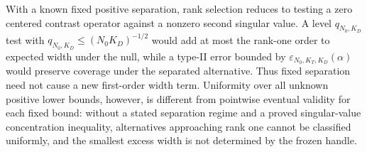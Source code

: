 With a known fixed positive separation, rank selection reduces to testing a zero centered contrast operator against a nonzero second singular value.  A level \(q_{N_0,K_D}\) test with \(q_{N_0,K_D}\le(N_0K_D)^{-1/2}\) would add at most the rank-one order to expected width under the null, while a type-II error bounded by \(\varepsilon_{N_0,K_T,K_D}(\alpha)\) would preserve coverage under the separated alternative.  Thus fixed separation need not cause a new first-order width term.  Uniformity over all unknown positive lower bounds, however, is different from pointwise eventual validity for each fixed bound: without a stated separation regime and a proved singular-value concentration inequality, alternatives approaching rank one cannot be classified uniformly, and the smallest excess width is not determined by the frozen handle.